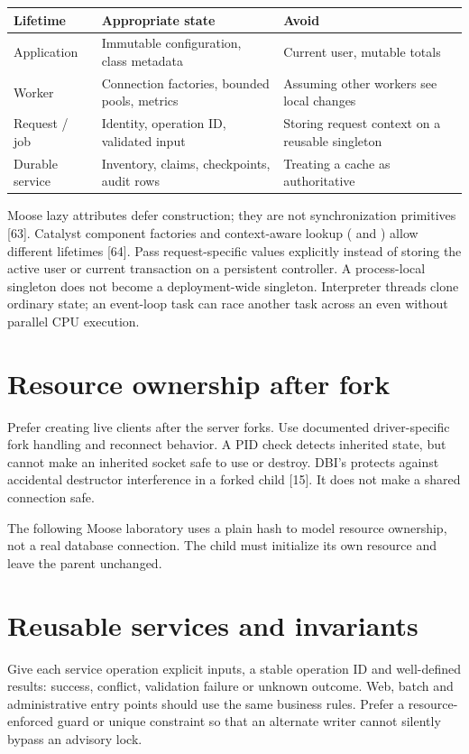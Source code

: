 \begin{longtable}{L{.22\linewidth}L{.33\linewidth}L{.37\linewidth}}
\toprule Lifetime & Appropriate state & Avoid \\ \midrule\endhead
Application & Immutable configuration, class metadata & Current user, mutable totals \\
Worker & Connection factories, bounded pools, metrics & Assuming other workers see local changes \\
Request / job & Identity, operation ID, validated input & Storing request context on a reusable singleton \\
Durable service & Inventory, claims, checkpoints, audit rows & Treating a cache as authoritative \\
\bottomrule
\end{longtable}

Moose lazy attributes defer construction; they are not synchronization
primitives [63]. Catalyst component factories and context-aware lookup
( and ) allow different lifetimes [64].
Pass request-specific values explicitly instead of storing the active user
or current transaction on a persistent controller. A process-local singleton
does not become a deployment-wide singleton. Interpreter threads clone ordinary
state; an event-loop task can race another task across an  even
without parallel CPU execution.

\section{Resource ownership after fork}
Prefer creating live clients after the server forks. Use documented
driver-specific fork handling and reconnect behavior. A PID check detects
inherited state, but cannot make an inherited socket safe to use or destroy.
DBI's  protects against accidental destructor
interference in a forked child [15]. It does not make a shared connection safe.


The following Moose laboratory uses a plain hash to model resource ownership,
not a real database connection. The child must initialize its own resource
and leave the parent unchanged.

\section{Reusable services and invariants}
Give each service operation explicit inputs, a stable operation ID and
well-defined results: success, conflict, validation failure or unknown
outcome. Web, batch and administrative entry points should use the same
business rules. Prefer a resource-enforced guard or unique constraint so
that an alternate writer cannot silently bypass an advisory lock.

